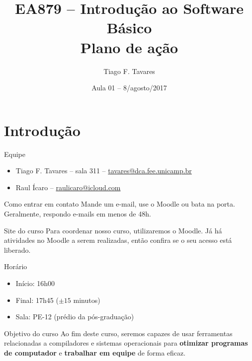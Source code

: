 \documentclass{beamer}
\title[01-Introdução]{EA879 -- Introdução ao Software Básico\\Plano de ação}
\author{Tiago F. Tavares}
\institute{FEEC -- UNICAMP}
\date{Aula 01 -- 8/agosto/2017}
\begin{document}
\begin{frame}
  \titlepage
\end{frame}


\section{Introdução}

\begin{frame}{Equipe}

\begin{itemize}
  \item Tiago F. Tavares -- sala 311 -- \url{tavares@dca.fee.unicamp.br}
  \item Raul Ícaro -- \url{raulicaro@icloud.com}
\end{itemize}

\vskip 1cm

\begin{block}{Como entrar em contato}
Mande um e-mail, use o Moodle ou bata na porta. Geralmente, respondo e-mails em menos de 48h.
\end{block}
\end{frame}


\begin{frame}{Site do curso}
\LARGE
Para coordenar nosso curso, utilizaremos o Moodle. Já há atividades no Moodle a serem realizadas, então confira se o seu acesso está liberado.
\end{frame}

\begin{frame}{Horário}
\LARGE
\begin{itemize}
\item Início: 16h00
\item Final: 17h45 ($\pm 15$ minutos)
\item Sala: PE-12 (prédio da pós-graduação)
\end{itemize}
\end{frame}

\begin{frame}{Objetivo do curso}
\LARGE
Ao fim deste curso, seremos capazes de usar ferramentas relacionadas a compiladores e sistemas operacionais para \textbf{otimizar programas de computador} e \textbf{trabalhar em equipe} de forma eficaz.
\end{frame}
\end{document}
